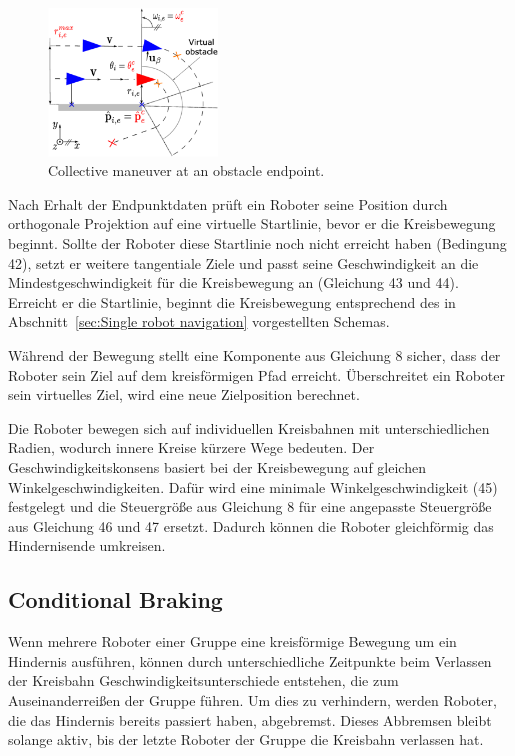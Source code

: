\documentclass[conference]{IEEEtran}
\begin{document}
\begin{figure}[h]
    \centering
    \includegraphics[width=0.4\textwidth]{Pictures/Collective maneuver at an obstacle endpoint.png}
    \caption{Collective maneuver at an obstacle endpoint.}
    \label{fig:Collective maneuver at an obstacle endpoint}
\end{figure}

Nach Erhalt der Endpunktdaten prüft ein Roboter seine 
Position durch orthogonale Projektion auf eine virtuelle Startlinie, 
bevor er die Kreisbewegung beginnt. Sollte der Roboter diese Startlinie noch nicht 
erreicht haben (Bedingung 42), setzt er weitere tangentiale Ziele und passt seine 
Geschwindigkeit an die Mindestgeschwindigkeit für die Kreisbewegung an 
(Gleichung 43 und 44). Erreicht er die Startlinie, beginnt die Kreisbewegung 
entsprechend des in 
Abschnitt~\ref{sec:Single robot navigation} vorgestellten Schemas.

Während der Bewegung stellt eine Komponente aus Gleichung 8 sicher, dass der Roboter 
sein Ziel auf dem kreisförmigen Pfad erreicht. Überschreitet ein Roboter sein 
virtuelles Ziel, wird eine neue Zielposition berechnet.

Die Roboter bewegen sich auf individuellen Kreisbahnen mit 
unterschiedlichen Radien, wodurch innere Kreise kürzere Wege bedeuten. 
Der Geschwindigkeitskonsens basiert bei der Kreisbewegung auf gleichen 
Winkelgeschwindigkeiten. Dafür wird eine minimale Winkelgeschwindigkeit (45) 
festgelegt und die Steuergröße aus Gleichung 8 für eine angepasste Steuergröße 
aus Gleichung 46 und 47 ersetzt. Dadurch können die Roboter gleichförmig das 
Hindernisende umkreisen.

\subsection*{Conditional Braking}

Wenn mehrere Roboter einer Gruppe eine kreisförmige Bewegung um ein Hindernis 
ausführen, können durch unterschiedliche Zeitpunkte beim Verlassen der Kreisbahn 
Geschwindigkeitsunterschiede entstehen, die zum Auseinanderreißen der Gruppe führen. 
Um dies zu verhindern, werden Roboter, die das Hindernis bereits passiert haben, 
abgebremst. Dieses Abbremsen bleibt solange aktiv, bis der letzte Roboter der 
Gruppe die Kreisbahn verlassen hat.
\end{document}
